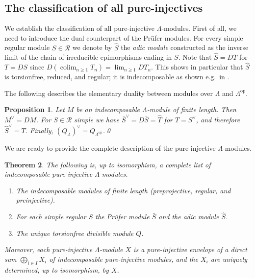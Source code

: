 \documentclass[a4paper]{amsart}
\theoremstyle{plain}
\newtheorem{thm}{Theorem}[section]
\newtheorem{prop}[thm]{Proposition}
\theoremstyle{definition}
\theoremstyle{remark}
\numberwithin{equation}{section}
\newcommand{\colim}{\operatorname*{colim}}
\newcommand{\op}{\mathrm{op}}
\def\R{\mathcal R}
\def\La{\Lambda}
\begin{document}
\subsection*{The classification of all pure-injectives}

We establish the classification of all pure-injective
$\La$-modules. First of all, we need to introduce the dual counterpart
of the Pr\"ufer modules. For every simple regular module $S\in\R$ we
denote by $\hat{S}$ the \emph{adic module} constructed as the inverse
limit of the chain of irreducible epimorphisms ending in $S$.  Note
that $\hat S=D\bar T$ for $T=DS$ since
$D(\colim_{n\ge 1}T_n)=\lim_{n\ge 1}DT_n$.  This shows in particular
that $\hat{S}$ is torsionfree, reduced, and regular; it is
indecomposable as shown e.g.~in \cite[p.~49]{CB2}.

The following describes the elementary duality between modules over
$\La$ and $\La^\op$.

\begin{prop}
  Let $M$ be an indecomposable $\La$-module of finite length. Then $M^\vee=DM$. For
  $S\in\R$ simple we have $\bar S^\vee=D\bar S=\hat T$ for
  $T=S^\vee$, and therefore  $\hat S^\vee=\bar T$. Finally,
  $(Q_\La)^\vee=Q_{\La^\op}$.\qed
\end{prop}


We are ready to provide the complete description of
the pure-injective $\La$-modules.

\begin{thm}\label{th:classification}
The following is, up to isomorphism, a complete list of indecomposable
pure-injective $\La$-modules.
\begin{enumerate}
\item The indecomposable modules of finite length (preprojective,
  regular, and preinjective).
\item For each simple regular $S$ the Pr\"ufer module $\bar S$
  and the adic module $\hat S$.
\item The unique torsionfree divisible module $Q$. 
\end{enumerate}
Moreover, each pure-injective $\La$-module $X$ is a pure-injective
envelope of a direct sum $\bigoplus_{i\in I}X_i$ of indecomposable
pure-injective modules, and the $X_i$ are uniquely determined, up to
isomorphism, by $X$.  
\end{thm}
\end{document}
